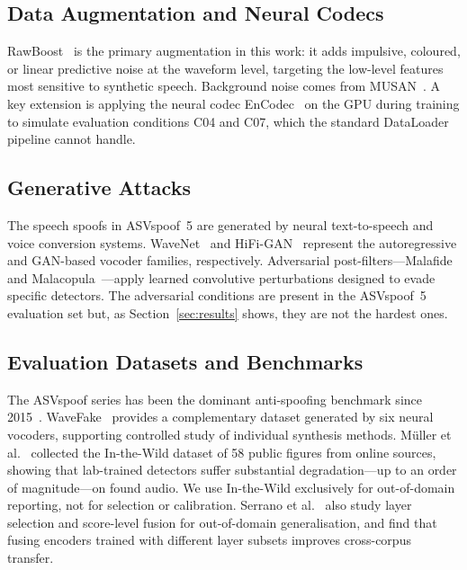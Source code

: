 \documentclass{llncs}
\begin{document}
\subsection{Data Augmentation and Neural Codecs}

RawBoost~\cite{rawboost} is the primary augmentation in this work: it adds
impulsive, coloured, or linear predictive noise at the waveform level, targeting
the low-level features most sensitive to synthetic speech.  Background noise comes
from MUSAN~\cite{musan}.  A key extension is applying the neural codec
EnCodec~\cite{encodec} on the GPU during training to simulate evaluation conditions
C04 and C07, which the standard DataLoader pipeline cannot handle.

\subsection{Generative Attacks}

The speech spoofs in ASVspoof~5 are generated by neural text-to-speech and voice
conversion systems.  WaveNet~\cite{wavenet} and HiFi-GAN~\cite{hifigan} represent
the autoregressive and GAN-based vocoder families, respectively.  Adversarial
post-filters---Malafide~\cite{malafide} and Malacopula~\cite{malacopula}---apply
learned convolutive perturbations designed to evade specific detectors.
The adversarial conditions are present in the ASVspoof~5 evaluation set but, as
Section~\ref{sec:results} shows, they are not the hardest ones.

\subsection{Evaluation Datasets and Benchmarks}

The ASVspoof series has been the dominant anti-spoofing benchmark since
2015~\cite{asvspoof2019,asvspoof2021,liu2023asvspoof,asvspoof5}.
WaveFake~\cite{wavefake} provides a complementary dataset generated by six neural
vocoders, supporting controlled study of individual synthesis methods.
M\"{u}ller et al.~\cite{intothewild} collected the In-the-Wild dataset of 58 public
figures from online sources, showing that lab-trained detectors suffer substantial
degradation---up to an order of magnitude---on found audio.  We use In-the-Wild
exclusively for out-of-domain reporting, not for selection or calibration.
Serrano et al.~\cite{serrano2025} also study layer selection and score-level fusion
for out-of-domain generalisation, and find that fusing encoders trained with
different layer subsets improves cross-corpus transfer.
\end{document}

